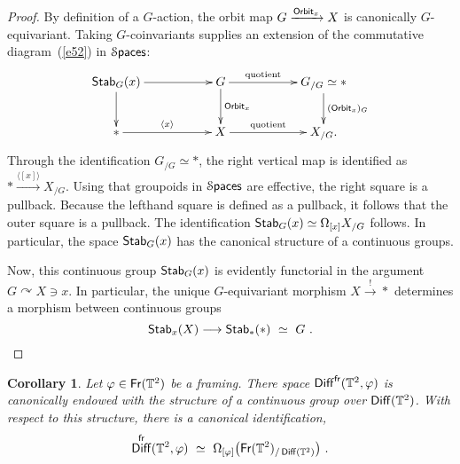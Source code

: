 \documentclass{amsart}
\newtheorem{cor}[theorem]{Corollary}
\theoremstyle{definition}
\theoremstyle{remark}
\newcommand{\lacts}{\curvearrowright}
\DeclareMathOperator{\Diff}{{\sf Diff}}
\DeclareMathOperator{\Spaces}{\cS\mathsf{paces}}
\DeclareMathOperator{\fr}{\sf fr}
\newcommand{\lag}{\langle}
\newcommand{\rag}{\rangle}
\newcommand{\xra}{\xrightarrow}
\DeclareMathOperator{\Fr}{\sf Fr}
\begin{document}
\begin{proof}
By definition of a $G$-action, the orbit map $G\xra{{\sf Orbit}_x} X$ is canonically $G$-equivariant.
Taking $G$-coinvariants supplies an extension of the commutative diagram~(\ref{e52}) in $\Spaces$:
\[
\xymatrix{
{\sf Stab}_G(x) 
\ar[rr] \ar[d]
&&
G 
\ar[d]^-{{\sf Orbit}_x} \ar[rr]^-{\rm quotient}
&&
G_{/G} 
\simeq 
\ast
\ar[d]^-{({\sf Orbit}_x)_{G}}
\\
\ast \ar[rr]^-{\lag x\rag}
&&
X
\ar[rr]^-{\rm quotient}
&&
X_{/G}
.
}
\]
Through the identification $G_{/G} \simeq \ast$, the right vertical map is identified as $\ast\xra{\lag [x] \rag} X_{/G}$.
Using that groupoids in $\Spaces$ are effective, the right square is a pullback.  
Because the lefthand square is defined as a pullback, it follows that the outer square is a pullback.
The identification ${\sf Stab}_G(x) \simeq \Omega_{[x]} X_{/G}$ follows.  
In particular, the space ${\sf Stab}_G(x)$ has the canonical structure of a continuous groups.


Now, this continuous group ${\sf Stab}_G(x)$ is evidently functorial in the argument $G \lacts X \ni x$.  
In particular, the unique $G$-equivariant morphism $X\xra{!} \ast$ determines a morphism between continuous groups
\[
{\sf Stab}_x(X)
\longrightarrow
{\sf Stab}_{\ast}(\ast)
~\simeq~
G
~.
\]


\end{proof}

\begin{cor}\label{t3}
Let $\varphi \in \Fr(\TT^2)$ be a framing.
There space $\Diff^{\fr}(\TT^2 , \varphi)$ is canonically endowed with the structure of a continuous group over $\Diff(\TT^2)$.
With respect to this structure, 
there is a canonical identification,
\[
\Diff^{\fr}(\TT^2, \varphi)
~\simeq~
\Omega_{[\varphi]} \bigl( \Fr(\TT^2)_{/\Diff(\TT^2)} \bigr)
~.
\]


\end{cor}
\end{document}
